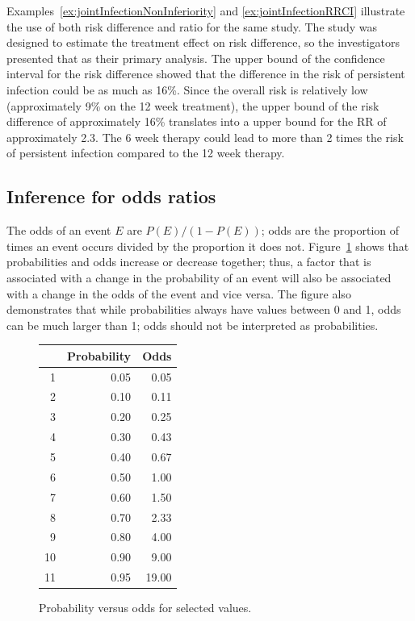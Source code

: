 Examples~\ref{ex:jointInfectionNonInferiority} and \ref{ex:jointInfectionRRCI} illustrate the use of both risk difference and ratio for the same study.   The study was designed to estimate the treatment effect on risk difference, so the investigators presented that as their primary analysis.  The upper bound of the confidence interval for the risk difference showed that the difference in the risk of persistent infection could be as much as 16\%.  Since the overall risk is relatively low (approximately 9\% on the 12 week treatment), the upper bound of the risk difference of approximately 16\% translates into a upper bound for the RR of approximately 2.3.  The 6 week therapy could lead to more than 2 times the risk of persistent infection compared to the 12 week therapy.


\subsection{Inference for odds ratios}
\label{inferenceOddsRatios}

The odds of an event $E$ are $P(E)/(1 - P(E))$; odds are the proportion of times an event occurs divided by the proportion it does not.  Figure~\ref{figure:probVsOdds} shows that probabilities and odds increase or decrease together; thus, a factor that is associated with a change in the probability of an event will also be associated with a change in the odds of the event and vice versa.  The figure also demonstrates that while probabilities always have values between 0 and 1, odds can be much larger than 1; odds should not be interpreted as probabilities.


\begin{figure}[ht]
\centering
\begin{tabular}{rrr}
  \hline
 & Probability & Odds \\
  \hline
1 & 0.05 & 0.05 \\
  2 & 0.10 & 0.11 \\
  3 & 0.20 & 0.25 \\
  4 & 0.30 & 0.43 \\
  5 & 0.40 & 0.67 \\
  6 & 0.50 & 1.00 \\
  7 & 0.60 & 1.50 \\
  8 & 0.70 & 2.33 \\
  9 & 0.80 & 4.00 \\
  10 & 0.90 & 9.00 \\
  11 & 0.95 & 19.00 \\
   \hline
\end{tabular}
\caption{Probability versus odds for selected values.}
\label{figure:probVsOdds}
\end{figure}

